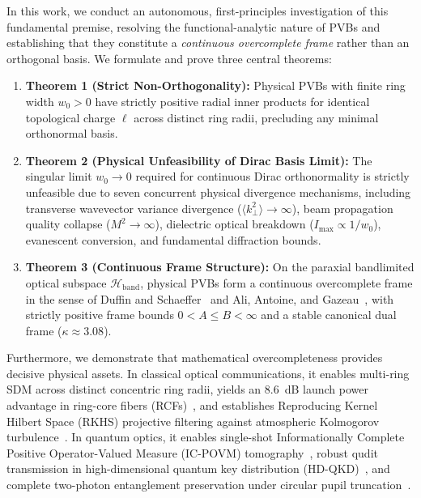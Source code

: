 \documentclass[11pt,a4paper]{article}
\begin{document}
In this work, we conduct an autonomous, first-principles investigation of this fundamental premise, resolving the functional-analytic nature of PVBs and establishing that they constitute a \emph{continuous overcomplete frame} rather than an orthogonal basis. We formulate and prove three central theorems:
\begin{enumerate}
    \item \textbf{Theorem 1 (Strict Non-Orthogonality):} Physical PVBs with finite ring width $w_0 > 0$ have strictly positive radial inner products for identical topological charge $\ell$ across distinct ring radii, precluding any minimal orthonormal basis.
    \item \textbf{Theorem 2 (Physical Unfeasibility of Dirac Basis Limit):} The singular limit $w_0 \to 0$ required for continuous Dirac orthonormality is strictly unfeasible due to seven concurrent physical divergence mechanisms, including transverse wavevector variance divergence ($\langle k_\perp^2 \rangle \to \infty$), beam propagation quality collapse ($M^2 \to \infty$), dielectric optical breakdown ($I_{\max} \propto 1/w_0$), evanescent conversion, and fundamental diffraction bounds.
    \item \textbf{Theorem 3 (Continuous Frame Structure):} On the paraxial bandlimited optical subspace $\mathcal{H}_{\text{band}}$, physical PVBs form a continuous overcomplete frame in the sense of Duffin and Schaeffer~\cite{Duffin1952} and Ali, Antoine, and Gazeau~\cite{Ali1993}, with strictly positive frame bounds $0 < A \le B < \infty$ and a stable canonical dual frame ($\kappa \approx 3.08$).
\end{enumerate}

Furthermore, we demonstrate that mathematical overcompleteness provides decisive physical assets. In classical optical communications, it enables multi-ring SDM across distinct concentric ring radii, yields an 8.6~dB launch power advantage in ring-core fibers (RCFs)~\cite{Villalba2023,RojasRojas2021}, and establishes Reproducing Kernel Hilbert Space (RKHS) projective filtering against atmospheric Kolmogorov turbulence~\cite{Kolmogorov1941,Fried1966,Noll1976,Paterson2005,TylerBoyd2009}. In quantum optics, it enables single-shot Informationally Complete Positive Operator-Valued Measure (IC-POVM) tomography~\cite{Renes2004,BraunsteinCaves1994}, robust qudit transmission in high-dimensional quantum key distribution (HD-QKD)~\cite{Cerf2002,Mirhosseini2015,BennettBrassard1984}, and complete two-photon entanglement preservation under circular pupil truncation~\cite{Clauser1969,LawEberly2004,Walborn2010,Sakurai2020}.
\end{document}
